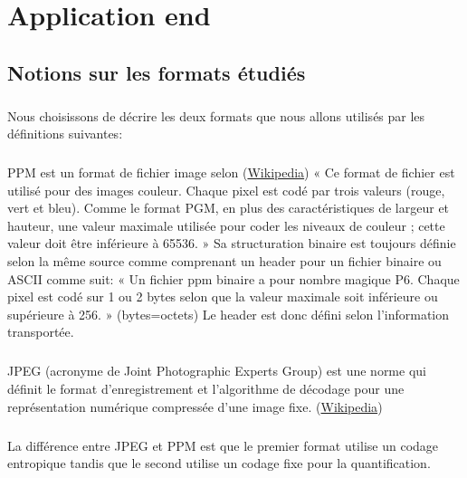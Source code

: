\chapter{Application end}

\minitoc


\section{Notions sur les formats étudiés}
\paragraph{}
Nous choisissons de décrire les deux formats que nous allons utilisés par les définitions suivantes:
\paragraph{}
PPM est un format de fichier image selon (\href{http://fr.wikipedia.org/wiki/Portable_pixmap#Fichier_binaire_3}{Wikipedia}) « Ce format de fichier est utilisé pour des images couleur. Chaque pixel est codé par trois valeurs (rouge, vert et bleu). Comme le format PGM, en plus des caractéristiques de largeur et hauteur, une valeur maximale utilisée pour coder les niveaux de couleur ; cette valeur doit être inférieure à 65536. »
Sa structuration binaire est toujours définie selon la même source comme comprenant un header pour un fichier binaire ou ASCII comme suit: « Un fichier ppm binaire a pour nombre magique P6. Chaque pixel est codé sur 1 ou 2 bytes selon que la valeur maximale soit inférieure ou supérieure à 256. » (bytes=octets) Le header est donc défini selon l'information transportée.
\paragraph{}
 	 JPEG (acronyme de Joint Photographic Experts Group) est une norme qui définit le format d'enregistrement et l'algorithme de décodage pour une représentation numérique compressée d'une image fixe. (\href{http://fr.wikipedia.org/wiki/JPEG}{Wikipedia})  

\paragraph{}
La différence entre JPEG et PPM est que le premier format utilise un codage entropique tandis que le second utilise un codage fixe pour la quantification.


